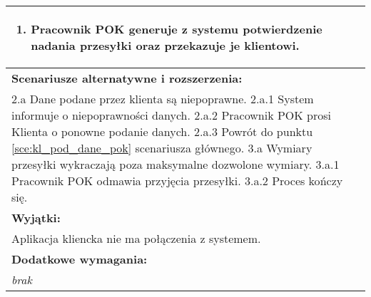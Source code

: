 \begin{center}
\begin{longtable}[h]{|p{1.6cm}|p{13.5cm}|}
{\begin{enumerate}
\item Pracownik POK generuje z systemu potwierdzenie nadania przesyłki oraz przekazuje je klientowi.
\end{enumerate}
} \\ \hline
\multicolumn{2}{|p{15.1cm}|}{\textbf{Scenariusze alternatywne i rozszerzenia:}} \\
\multicolumn{2}{|p{15.1cm}|}{
2.a Dane podane przez klienta są niepoprawne. \newline
2.a.1 System informuje o niepoprawności danych. \newline
2.a.2 Pracownik POK prosi Klienta o ponowne podanie danych. \newline
2.a.3 Powrót do punktu \ref{sce:kl_pod_dane_pok} scenariusza głównego. \newline
\newline
3.a Wymiary przesyłki wykraczają poza maksymalne dozwolone wymiary. \newline
3.a.1 Pracownik POK odmawia przyjęcia przesyłki. \newline
3.a.2 Proces kończy się.
} \\ \hline
\multicolumn{2}{|p{15.1cm}|}{\textbf{Wyjątki:}} \\
\multicolumn{2}{|p{15.1cm}|}{
Aplikacja kliencka nie ma połączenia z systemem.
} \\ \hline
\multicolumn{2}{|p{15.1cm}|}{\textbf{Dodatkowe wymagania:}} \\
\multicolumn{2}{|p{15.1cm}|}{
\textit{brak}
} \\
\hline
\end{longtable}
\end{center}

